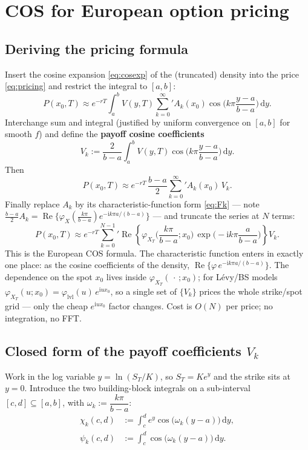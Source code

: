 \documentclass[11pt]{article}
\newcommand{\Real}{\operatorname{Re}}
\newcommand{\ii}{\mathrm{i}}
\newcommand{\dd}{\,\mathrm{d}}
\newcommand{\ch}{\varphi}
\begin{document}
\section{COS for European option pricing}\label{sec:cos-pricing}

\subsection{Deriving the pricing formula}
Insert the cosine expansion \eqref{eq:cosexp} of the (truncated) density into the price \eqref{eq:pricing} and
restrict the integral to $[a,b]$:
\begin{equation}
P(x_0,T)\approx e^{-rT}\int_a^b V(y,T)
{\sum_{k=0}^{\infty}}' A_k(x_0)\cos\!\Big(k\pi\frac{y-a}{b-a}\Big)\dd y .
\end{equation}
Interchange sum and integral (justified by uniform convergence on $[a,b]$ for smooth $f$) and define the
\textbf{payoff cosine coefficients}
\begin{equation}\label{eq:Vkdef}
V_k:=\frac{2}{b-a}\int_a^b V(y,T)\cos\!\Big(k\pi\frac{y-a}{b-a}\Big)\dd y .
\end{equation}
Then
\begin{equation}\label{eq:AkVk}
P(x_0,T)\approx e^{-rT}\,\frac{b-a}{2}{\sum_{k=0}^{\infty}}' A_k(x_0)\,V_k .
\end{equation}
Finally replace $A_k$ by its characteristic-function form \eqref{eq:Fk} --- note
$\tfrac{b-a}{2}A_k=\Real\{\ch_X(\tfrac{k\pi}{b-a})e^{-\ii k\pi a/(b-a)}\}$ --- and truncate the series at $N$
terms:
\begin{equation}\label{eq:cosprice}
\boxed{\;P(x_0,T)\approx e^{-rT}{\sum_{k=0}^{N-1}}'
\Real\!\left\{\ch_{X_T}\!\Big(\frac{k\pi}{b-a};x_0\Big)\,
\exp\!\Big(-\ii k\pi\frac{a}{b-a}\Big)\right\}V_k .\;}
\end{equation}
This is the European COS formula. The characteristic function enters in exactly one place: as the cosine
coefficients of the density, $\Real\{\ch\,e^{-\ii k\pi a/(b-a)}\}$. The dependence on the spot $x_0$ lives
inside $\ch_{X_T}(\,\cdot\,;x_0)$; for L\'evy/BS models $\ch_{X_T}(u;x_0)=\ch_{\text{lvl}}(u)\,e^{\ii u x_0}$,
so a single set of $\{V_k\}$ prices the whole strike/spot grid --- only the cheap $e^{\ii u x_0}$ factor
changes. Cost is $O(N)$ per price; no integration, no FFT.

\subsection{Closed form of the payoff coefficients $V_k$}\label{sec:Vk}
Work in the log variable $y=\ln(S_T/K)$, so $S_T=K e^{y}$ and the strike sits at $y=0$. Introduce the two
building-block integrals on a sub-interval $[c,d]\subseteq[a,b]$, with $\omega_k:=\dfrac{k\pi}{b-a}$:
\begin{align}
\chi_k(c,d)&:=\int_c^d e^{y}\cos\!\big(\omega_k(y-a)\big)\dd y,\label{eq:chi}\\
\psi_k(c,d)&:=\int_c^d \cos\!\big(\omega_k(y-a)\big)\dd y.\label{eq:psi}
\end{align}
\end{document}
